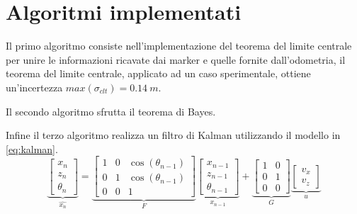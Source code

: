 \documentclass[
	a4paper, %
	10pt, %
]{LTJournalArticle}
\begin{document}
\section{Algoritmi implementati}

Il primo algoritmo consiste nell'implementazione del teorema del limite centrale per unire le informazioni ricavate dai marker e quelle fornite dall'odometria, il teorema del limite centrale, applicato ad un caso sperimentale, ottiene un'incertezza $max(\sigma_{clt}) = 0.14\ m$.

Il secondo algoritmo sfrutta il teorema di Bayes.

Infine il terzo algoritmo realizza un filtro di Kalman utilizzando il modello in \ref{eq:kalman}.
\begin{equation}
\underbrace{
    \begin{bmatrix}
            x_{n}\\z_{n}\\\theta_{n}
    \end{bmatrix}
}_{\hat{x_n}}
=\underbrace{
    \begin{bmatrix}
           1 & 0 & \cos(\theta_{n-1})\\
           0 & 1 & \cos(\theta_{n-1})\\
           0 & 0 & 1
    \end{bmatrix}
}_{F}
\underbrace{
    \begin{bmatrix}
            x_{n-1}\\z_{n-1}\\\theta_{n-1}
    \end{bmatrix}
}_{x_{n-1}}
+
\underbrace{
    \begin{bmatrix}
           1 & 0 \\
           0 & 1 \\
           0 & 0
    \end{bmatrix}
}_{G}
\underbrace{
    \begin{bmatrix}
           v_{x}\\
           v_{z}
    \end{bmatrix}
}_{u}
\label{eq:kalman}
\end{equation}

\printbibliography %

\end{document}
